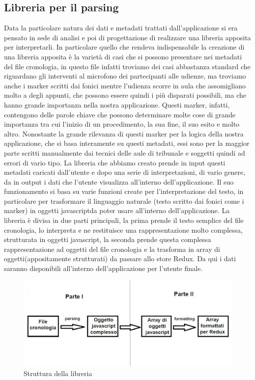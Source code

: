 \subsection{Libreria per il parsing}
Data la particolare natura dei dati e metadati trattati dall'applicazione si era pensato in sede di analisi e poi di progettazione di realizzare una libreria apposita per
interpretarli. In particolare quello che rendeva indispensabile la creazione di una libreria apposita è la varietà di casi che si possono presentare nei metadati del
file cronologia, in questo file infatti troviamo dei casi abbastanza standard che riguardano gli interventi al microfono dei partecipanti alle udienze, ma troviamo anche
i marker scritti dai fonici mentre l'udienza scorre in aula che assomigliano molto a degli appunti, che possono essere quindi i più disparati possibili, ma che hanno
grande importanza nella nostra applicazione. Questi marker, infatti, contengono delle parole chiave che possono determinare molte cose di grande importanza tra cui
l'inizio di un procedimento, la sua fine, il suo esito e molto altro. Nonostante la grande rilevanza di questi marker per la logica della nostra applicazione,
che si basa interamente su questi metadati, essi sono per la maggior parte scritti manualmente dai tecnici delle aule di tribunale e soggetti quindi ad errori di vario tipo.
La libreria che abbiamo creato prende in input questi metadati caricati dall'utente e dopo una serie di interpretazioni, di vario genere, da in output i dati che l'utente
visualizza all'interno dell'applicazione. Il suo funzionamento si basa su varie funzioni create per l'interpretazione del testo, in particolare per trasformare
il linguaggio naturale (testo scritto dai fonici come i marker) in \gls{oggetti javascript}\glsfirstoccur da poter usare all'interno dell'applicazione. La libreria è divisa in due parti principali,
la prima prende il testo semplice del file cronologia, lo interpreta e ne restituisce una rappresentazione molto complessa, strutturata in oggetti javascript, la seconda
prende questa complessa rappresentazione ad oggetti del file cronologia e la trasforma in \gls{array di oggetti}\glsfirstoccur (appositamente strutturati) da passare allo store Redux. Da
qui i dati saranno disponibili all'interno dell'applicazione per l'utente finale.
\begin{figure}[H]
  \centering
  \includegraphics[width=\textwidth]{immagini/libreria-funzionamento.png}
  \caption{Struttura della libreria}
\end{figure}
